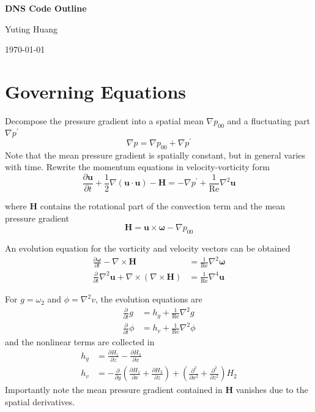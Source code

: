 \documentclass[titlepage,12pt,letter]{article}
\numberwithin{equation}{section}
\begin{document}
{\centering
{\huge\textbf{DNS Code Outline} \par}

\vspace{0.2in}
Yuting Huang\par
\today\par}

\section{Governing Equations}
Decompose the pressure gradient into a spatial mean $\nabla p_{00}$ and a fluctuating part $\nabla p^{\prime}$
\begin{equation*}
	\nabla p=\nabla p_{00}+\nabla p^{\prime}
\end{equation*}
Note that the mean pressure gradient is spatially constant, but in general varies with time. Rewrite the momentum equations in velocity-vorticity form
\begin{equation*}
	\frac{\partial \bm{u}}{\partial t}+\frac{1}{2} \nabla(\bm{u} \cdot \bm{u})-\bm{H}=-\nabla p^{\prime}+\frac{1}{\operatorname{Re}} \nabla^{2} \bm{u}
\end{equation*}

where $\bm{H}$ contains the rotational part of the convection term and the mean pressure gradient
\begin{equation*}
	\bm{H}=\bm{u} \times \bm{\omega}-\nabla p_{00}
\end{equation*}

An evolution equation for the vorticity and velocity vectors can be obtained
\begin{align*}
	\frac{\partial \bm{\omega}}{\partial t}-\nabla \times \bm{H}&=\frac{1}{\operatorname{Re}} \nabla^{2} \bm{\omega}\\
	\frac{\partial}{\partial t} \nabla^{2} \bm{u}+\nabla \times(\nabla \times \bm{H})&=\frac{1}{\operatorname{Re}} \nabla^{4} \bm{u}
\end{align*}

For $g = \omega_2$ and $\phi = \nabla^2 v$, the evolution equations are
\begin{align}
	\frac{\partial}{\partial t} g &=h_{g}+\frac{1}{\operatorname{Re}} \nabla^{2} g \label{eq:vor}\\
	\frac{\partial}{\partial t} \phi &=h_{v}+\frac{1}{\operatorname{Re}} \nabla^{2} \phi \label{eq:phi}
\end{align}
and the nonlinear terms are collected in
\begin{align}
	h_{g} &=\frac{\partial H_{1}}{\partial z}-\frac{\partial H_{3}}{\partial x} \\
	h_{v} &=-\frac{\partial}{\partial y}\left(\frac{\partial H_{1}}{\partial x}+\frac{\partial H_{3}}{\partial z}\right)+\left(\frac{\partial^{2}}{\partial x^{2}}+\frac{\partial^{2}}{\partial z^{2}}\right) H_{2}
\end{align}
Importantly note the mean pressure gradient contained in $\bm{H}$ vanishes due to the spatial derivatives.
\end{document}
